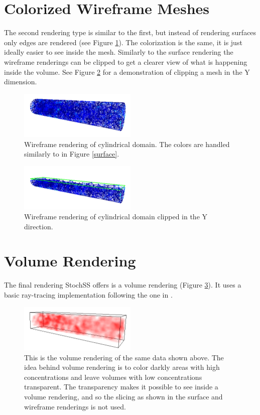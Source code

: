 \section{Colorized Wireframe Meshes}

The second rendering type is similar to the first, but instead of rendering surfaces only edges are rendered (see Figure \ref{wireframe}). The colorization is the same, it is just ideally easier to see inside the mesh. Similarly to the surface rendering the wireframe renderings can be clipped to get a clearer view of what is happening inside the volume. See Figure \ref{clipy} for a demonstration of clipping a mesh in the Y dimension.

\begin{figure}[!ht]
  \centering
    \includegraphics[width=0.5\textwidth]{Vis/wireframe}
  \caption{ Wireframe rendering of cylindrical domain. The colors are handled similarly to in Figure \ref{surface}. }
  \label{wireframe}
\end{figure}

\begin{figure}[!ht]
  \centering
    \includegraphics[width=0.5\textwidth]{Vis/clipy}
  \caption{ Wireframe rendering of cylindrical domain clipped in the Y direction. }
  \label{clipy}
\end{figure}

\section{Volume Rendering}

The final rendering StochSS offers is a volume rendering (Figure \ref{fig:volume}). It uses a basic ray-tracing implementation following the one in \cite{congote}.

\begin{figure}[!ht]
  \centering
    \includegraphics[width=0.5\textwidth]{Vis/volume}
  \caption{ This is the volume rendering of the same data shown above. The idea behind volume rendering is to color darkly areas with high concentrations and leave volumes with low concentrations transparent. The transparency makes it possible to see inside a volume rendering, and so the slicing as shown in the surface and wireframe renderings is not used. }
  \label{fig:volume}
\end{figure}

